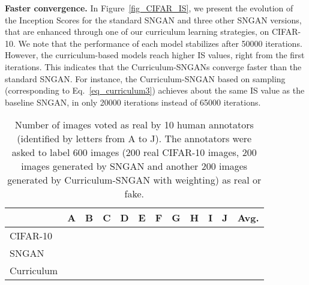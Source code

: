 \documentclass[10pt,twocolumn,letterpaper]{article}
\begin{document}
\noindent
{\bf Faster convergence.}
In Figure~\ref{fig_CIFAR_IS}, we present the evolution of the Inception Scores for the standard SNGAN and three other SNGAN versions, that are enhanced through one of our curriculum learning strategies, on CIFAR-10. We note that the performance of each model stabilizes after 50000 iterations. However, the curriculum-based models reach higher IS values, right from the first iterations. This indicates that the Curriculum-SNGANs converge faster than the standard SNGAN. For instance, the Curriculum-SNGAN based on sampling (corresponding to Eq.~\eqref{eq_curriculum3}) achieves about the same IS value as the baseline SNGAN, in only 20000 iterations instead of 65000 iterations.

\begin{table}[t]
\setlength\tabcolsep{1.2pt}
\small{
\begin{center}
\begin{tabular}{|l|c|c|c|c|c|c|c|c|c|c|c|}
\hline
                & A & B & C & D & E & F & G & H & I & J & Avg. \\
\hline
\hline
CIFAR-10        &  &  &  &  &  &  &  &  &   &  &  \\
\hline
SNGAN~\cite{Miyato-ICLR-2018}   &   &  &   &   &   &   &   &   &   &   &  \\
\hline
Curriculum      &   &  &   &   &   &   &   &   &   &   &  \\
\hline
\end{tabular}
\end{center}
\vspace*{-0.15cm}
\caption{Number of images voted as real by 10 human annotators (identified by letters from A to J). The annotators were asked to label 600 images (200 real CIFAR-10 images, 200 images generated by SNGAN and another 200 images generated by Curriculum-SNGAN with weighting) as real or fake.\label{tab_results_human_CIFAR}}
}
\vspace*{-0.4cm}
\end{table}
\end{document}
